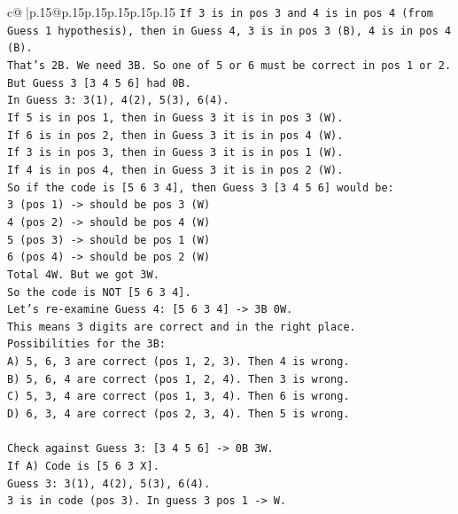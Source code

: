 \documentclass{article}
\begin{document}
{\begin{supertabular}{c@{$\;$}|p{.15\linewidth}@{}p{.15\linewidth}p{.15\linewidth}p{.15\linewidth}p{.15\linewidth}p{.15\linewidth}}
{{{\texttt{If 3 is in pos 3 and 4 is in pos 4 (from Guess 1 hypothesis), then in Guess 4, 3 is in pos 3 (B), 4 is in pos 4 (B).} \\
\texttt{That's 2B. We need 3B. So one of 5 or 6 must be correct in pos 1 or 2.} \\
\texttt{But Guess 3 {[}3 4 5 6{]} had 0B.} \\
\texttt{In Guess 3: 3(1), 4(2), 5(3), 6(4).} \\
\texttt{If 5 is in pos 1, then in Guess 3 it is in pos 3 (W).} \\
\texttt{If 6 is in pos 2, then in Guess 3 it is in pos 4 (W).} \\
\texttt{If 3 is in pos 3, then in Guess 3 it is in pos 1 (W).} \\
\texttt{If 4 is in pos 4, then in Guess 3 it is in pos 2 (W).} \\
\texttt{So if the code is {[}5 6 3 4{]}, then Guess 3 {[}3 4 5 6{]} would be:} \\
\texttt{3 (pos 1) {-}> should be pos 3 (W)} \\
\texttt{4 (pos 2) {-}> should be pos 4 (W)} \\
\texttt{5 (pos 3) {-}> should be pos 1 (W)} \\
\texttt{6 (pos 4) {-}> should be pos 2 (W)} \\
\texttt{Total 4W. But we got 3W.} \\
\texttt{So the code is NOT {[}5 6 3 4{]}.} \\
\texttt{Let's re{-}examine Guess 4: {[}5 6 3 4{]} {-}> 3B 0W.} \\
\texttt{This means 3 digits are correct and in the right place.} \\
\texttt{Possibilities for the 3B:} \\
\texttt{A) 5, 6, 3 are correct (pos 1, 2, 3). Then 4 is wrong.} \\
\texttt{B) 5, 6, 4 are correct (pos 1, 2, 4). Then 3 is wrong.} \\
\texttt{C) 5, 3, 4 are correct (pos 1, 3, 4). Then 6 is wrong.} \\
\texttt{D) 6, 3, 4 are correct (pos 2, 3, 4). Then 5 is wrong.} \\
\\ 
\texttt{Check against Guess 3: {[}3 4 5 6{]} {-}> 0B 3W.} \\
\texttt{If A) Code is {[}5 6 3 X{]}.} \\
\texttt{Guess 3: 3(1), 4(2), 5(3), 6(4).} \\
\texttt{3 is in code (pos 3). In guess 3 pos 1 {-}> W.} \\
}}}
\end{supertabular}}
\end{document}

